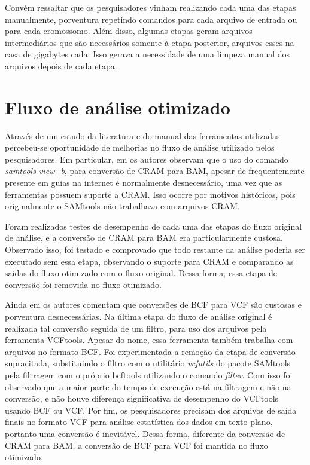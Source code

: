 \documentclass[cic,tc]{iiufrgs}
\begin{document}
Convém ressaltar que os pesquisadores vinham realizando cada uma das etapas
manualmente, porventura repetindo comandos para cada arquivo de entrada ou para
cada cromossomo. Além disso, algumas etapas geram arquivos intermediários que
são necessários somente à etapa posterior, arquivos esses na casa de gigabytes
cada. Isso gerava a necessidade de uma limpeza manual dos arquivos depois de
cada etapa.

\section{Fluxo de análise otimizado}
\label{sec:opt}

Através de um estudo da literatura e do manual das ferramentas utilizadas
percebeu-se oportunidade de melhorias no fluxo de análise utilizado pelos
pesquisadores. Em particular, em \cite{danecek2021twelve} os autores observam
que o uso do comando \textit{samtools view -b}, para conversão de CRAM para
BAM, apesar de frequentemente presente em guias na internet é normalmente
desnecessário, uma vez que as ferramentas possuem suporte a CRAM. Isso ocorre
por motivos históricos, pois originalmente o SAMtools não trabalhava com
arquivos CRAM.\cite{danecek2021twelve}

Foram realizados testes de desempenho de cada uma das etapas do fluxo original
de análise, e a conversão de CRAM para BAM era particularmente custosa.
Observado isso, foi testado e comprovado que todo restante da análise poderia
ser executado sem essa etapa, observando o suporte para CRAM e comparando as
saídas do fluxo otimizado com o fluxo original. Dessa forma, essa etapa de
conversão foi removida no fluxo otimizado.

Ainda em \cite{danecek2021twelve} os autores comentam que conversões de BCF
para VCF são custosas e porventura desnecessárias. Na última etapa do fluxo de
análise original é realizada tal conversão seguida de um filtro, para uso dos
arquivos pela ferramenta VCFtools. Apesar do nome, essa ferramenta também
trabalha com arquivos no formato BCF.\cite{man2015vcftools} Foi experimentada a
remoção da etapa de conversão supracitada, substituindo o filtro com o
utilitário \textit{vcfutils} do pacote SAMtools pela filtragem com o próprio
bcftools utilizando o comando \textit{filter}. Com isso foi observado que a
maior parte do tempo de execução está na filtragem e não na conversão, e não
houve diferença significativa de desempenho do VCFtools usando BCF ou VCF. Por
fim, os pesquisadores precisam dos arquivos de saída finais no formato VCF para
análise estatística dos dados em texto plano, portanto uma conversão é
inevitável. Dessa forma, diferente da conversão de CRAM para BAM, a conversão
de BCF para VCF foi mantida no fluxo otimizado.
\end{document}
